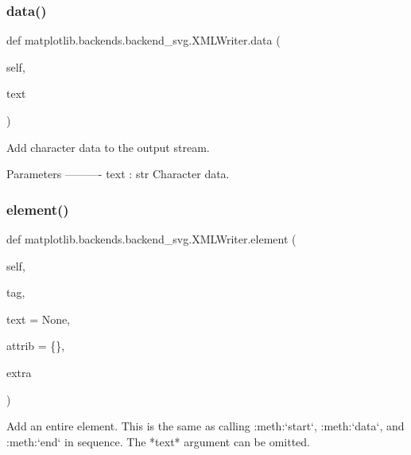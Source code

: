 \subsubsection{\texorpdfstring{data()}{data()}}
{\footnotesize\ttfamily def matplotlib.\+backends.\+backend\+\_\+svg.\+X\+M\+L\+Writer.\+data (\begin{DoxyParamCaption}\item[{}]{self,  }\item[{}]{text }\end{DoxyParamCaption})}

\begin{DoxyVerb}Add character data to the output stream.

Parameters
----------
text : str
    Character data.
\end{DoxyVerb}
 \mbox{\label{classmatplotlib_1_1backends_1_1backend__svg_1_1XMLWriter_ace3f1df94b65dc0eb62298f59cc03c84}} 
\subsubsection{\texorpdfstring{element()}{element()}}
{\footnotesize\ttfamily def matplotlib.\+backends.\+backend\+\_\+svg.\+X\+M\+L\+Writer.\+element (\begin{DoxyParamCaption}\item[{}]{self,  }\item[{}]{tag,  }\item[{}]{text = {\ttfamily None},  }\item[{}]{attrib = {\ttfamily \{\}},  }\item[{}]{extra }\end{DoxyParamCaption})}

\begin{DoxyVerb}Add an entire element.  This is the same as calling :meth:`start`,
:meth:`data`, and :meth:`end` in sequence. The *text* argument can be
omitted.
\end{DoxyVerb}
 \mbox{\label{classmatplotlib_1_1backends_1_1backend__svg_1_1XMLWriter_ab4fe56b2d2188df02a791a7b59461624}} 
